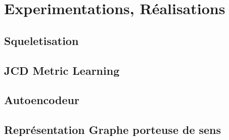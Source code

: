 \clearpage
\section{Experimentations, Réalisations}
\label{sec:SOTA}

\subsection{Squeletisation}

\subsection{JCD Metric Learning}

\subsection{Autoencodeur}

\subsection{Représentation Graphe porteuse de sens}